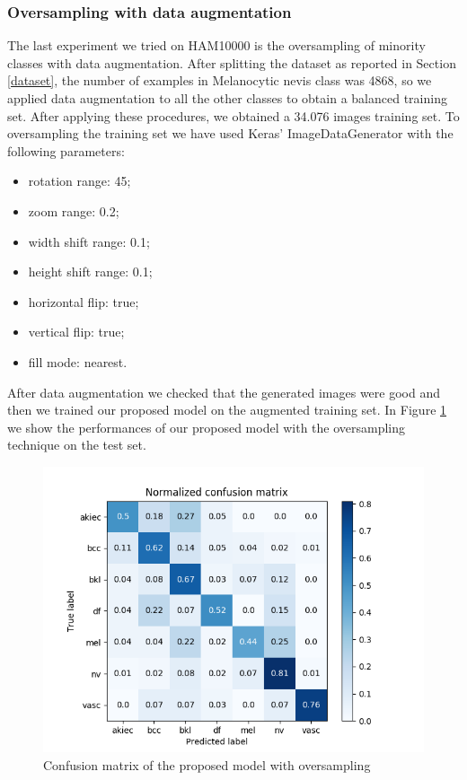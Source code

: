 	\subsubsection{Oversampling with data augmentation}
	
		The last experiment we tried on HAM10000 is the oversampling of minority classes with data augmentation. After splitting the dataset as reported in Section \ref{dataset}, the number of examples in Melanocytic nevis class was 4868, so we applied data augmentation to all the other classes to obtain a balanced training set. After applying these procedures, we obtained a 34.076 images training set.
		To oversampling the training set we have used Keras' ImageDataGenerator with the following parameters:
		\begin{itemize}
			\item rotation range: 45; 
			\item zoom range: 0.2; 
			\item width shift range: 0.1;
			\item height shift range: 0.1;
			\item horizontal flip: true; 
			\item vertical flip: true;
			\item fill mode: nearest.
		\end{itemize}
		
		After data augmentation we checked that the generated images were good and then we trained our proposed model on the augmented training set.
		In Figure \ref{fig:third-matrix} we show the performances of our proposed model with the oversampling technique on the test set.
		
		\begin{figure}[H]
			\centering
			\includegraphics[width=15cm]{images/thirdMatrix.png}
			\caption{Confusion matrix of the proposed model with oversampling}
			\label{fig:third-matrix}
		\end{figure}
		
